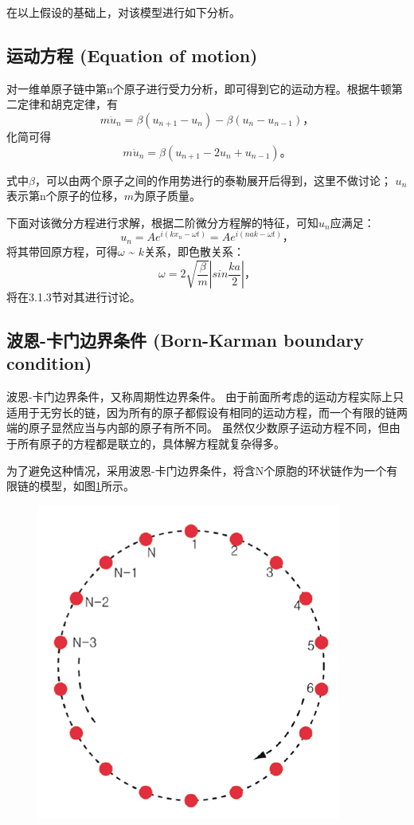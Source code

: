 \documentclass[declarePage]{ecnuthesis}
\begin{document}
在以上假设的基础上，对该模型进行如下分析。

\subsection{运动方程 (Equation of motion)}

对一维单原子链中第n个原子进行受力分析，即可得到它的运动方程。根据牛顿第二定律和胡克定律，有
\begin{equation}
    m \ddot{u}_n = \beta (u_{n+1} - u_n) - \beta (u_n - u_{n-1}) \text{，}
\end{equation}
化简可得
\begin{equation}
    m \ddot{u}_n = \beta (u_{n+1} - 2u_n + u_{n-1}) \text{。}
\end{equation}

式中$\beta$，可以由两个原子之间的作用势进行的泰勒展开后得到，这里不做讨论；%
$u_n$表示第n个原子的位移，$m$为原子质量。

下面对该微分方程进行求解，根据二阶微分方程解的特征，可知$u_n$应满足：
\begin{equation}
    u_n = A e^{i(kx_n - \omega t)} = A e^{i(nak - \omega t)} \text{，}
\end{equation}
将其带回原方程，可得$\omega$ \~{} $k$关系，即色散关系：
\begin{equation}
    \omega = 2 \sqrt{\frac{\beta}{m}} \left | sin \frac{ka}{2} \right | \text{，}
\end{equation}
将在3.1.3节对其进行讨论。

\subsection{波恩-卡门边界条件 (Born-Karman boundary condition)}
波恩-卡门边界条件，又称周期性边界条件。%
由于前面所考虑的运动方程实际上只适用于无穷长的链，因为所有的原子都假设有相同的运动方程，而一个有限的链两端的原子显然应当与内部的原子有所不同。%
虽然仅少数原子运动方程不同，但由于所有原子的方程都是联立的，具体解方程就复杂得多。

为了避免这种情况，采用波恩-卡门边界条件，将含N个原胞的环状链作为一个有限链的模型，如图\ref{BKBC}所示。
\begin{figure}[htb]
    \centering
    \includegraphics[width=.5\textwidth]{BKBC.png}
    \label{BKBC}
\end{figure}
\end{document}
